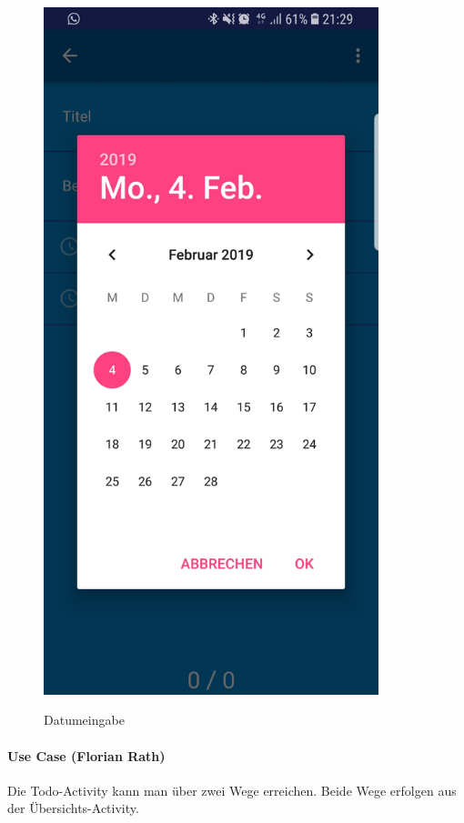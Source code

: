 \begin{figure}[H]
\centering
\begin{minipage}[t]{1\textwidth} %
\caption{Datumeingabe} %
\includegraphics[height=20cm]{img/Todo_Datepicker}\\ %
\end{minipage}
\end{figure}

\paragraph{Use Case (Florian Rath)}
Die Todo-Activity kann man über zwei Wege erreichen. Beide Wege erfolgen aus der Übersichts-Activity.

